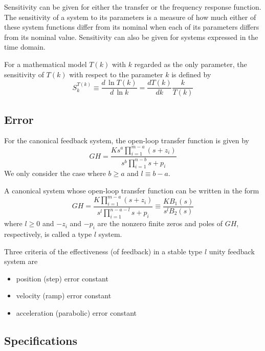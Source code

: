 \documentclass[11pt]{book}
\theoremstyle{example}
\begin{document}
Sensitivity can be given for either the transfer or the frequency response function. The sensitivity of a system to its parameters is a measure of how much either of these system functions differ from its nominal when each of its parameters differs from its nominal value. Sensitivity can also be given for systems expressed in the time domain.

For a mathematical model $T(k)$ with $k$ regarded as the only parameter, the sensitivity of $T(k)$ with respect to the parameter $k$ is defined by
\begin{equation}
	S_k^{T(k)}\equiv\frac{d\,\ln{T(k)}}{d\,\ln{k}}=\frac{dT(k)}{dk}\frac{k}{T(k)}
\end{equation}

\subsection{Error}

For the canonical feedback system, the open-loop transfer function is given by
\begin{equation}
	GH=\frac{Ks^a\prod_{i=1}^{m-a}{(s+z_i)}}{s^b\prod_{i=1}^{n-b}{s+p_i}}
\end{equation}
We only consider the case where $b\geq{a}$ and $l\equiv{b-a}$.

A canonical system whose open-loop transfer function can be written in the form
\begin{equation}
	GH=\frac{K\prod_{i=1}^{m-a}{(s+z_i)}}{s^l\prod_{i=1}^{n-a-l}{s+p_i}}\equiv\frac{KB_1(s)}{s^lB_2(s)}
\end{equation}
where $l\geq{0}$ and $-z_i$ and $-p_i$ are the nonzero finite zeros and poles of $GH$, respectively, is called a type $l$ system.

Three criteria of the effectiveness (of feedback) in a stable type $l$ unity feedback system are
\begin{itemize}
	\item position (step) error constant
	\item velocity (ramp) error constant
	\item acceleration (parabolic) error constant
\end{itemize}

\subsection{Specifications}
\end{document}
